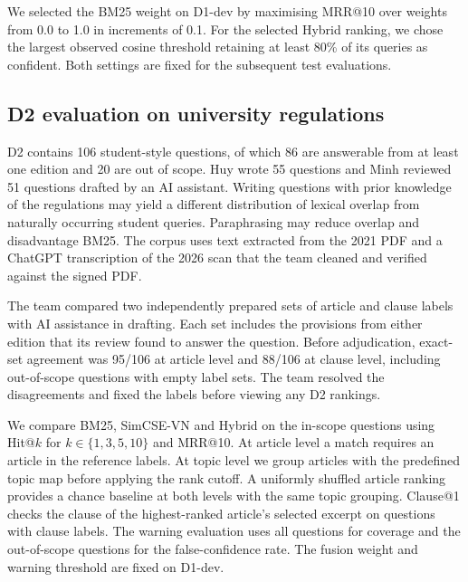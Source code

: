 We selected the BM25 weight on D1-dev by maximising MRR@10 over
weights from 0.0 to 1.0 in increments of 0.1. For the selected
Hybrid ranking, we chose the largest observed cosine threshold retaining
at least 80\% of its queries as confident. Both settings are fixed for
the subsequent test evaluations.

\subsection{D2 evaluation on university regulations}
\label{sec:d2-setup}
D2 contains 106 student-style questions, of which 86 are answerable from
at least one edition and 20 are out of scope. %
Huy wrote 55 questions and Minh reviewed 51 questions drafted by an AI
assistant. %
Writing questions with prior knowledge of the regulations may yield a
different distribution of lexical overlap from naturally occurring
student queries. Paraphrasing may reduce overlap and disadvantage BM25.
The corpus uses text extracted from the 2021 PDF and a ChatGPT
transcription of the 2026 scan that the team cleaned and verified
against the signed PDF. %

The team compared two independently prepared sets of article and clause
labels with AI assistance in drafting. Each set includes the provisions
from either edition that its review found to answer the question.
Before adjudication, exact-set agreement was 95/106 at article level and
88/106 at clause level, including out-of-scope questions with empty label
sets. %
The team resolved the disagreements and fixed the labels before viewing
any D2 rankings. %

We compare BM25, SimCSE-VN and Hybrid on the in-scope questions using
Hit@$k$ for $k\in\{1,3,5,10\}$ and MRR@10. %
At article level a match requires an article in the reference labels.
At topic level we group articles with the predefined topic map before
applying the rank cutoff. A uniformly shuffled article ranking provides
a chance baseline at both levels with the same topic grouping. Clause@1
checks the clause of the highest-ranked article's selected excerpt on
questions with clause labels. %
The warning evaluation uses all questions for coverage and the
out-of-scope questions for the false-confidence rate. The fusion
weight and warning threshold are fixed on D1-dev.
